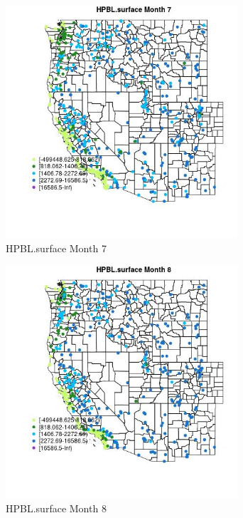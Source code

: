 \begin{figure} 
\centering  
\includegraphics[width=0.77\textwidth]{Code_Outputs/Report_ML_input_PM25_Step4_part_e_de_duplicated_aves_compiled_2019-05-14wNAs_MapObsMo7HPBLsurface.jpg} 
\caption{\label{fig:Report_ML_input_PM25_Step4_part_e_de_duplicated_aves_compiled_2019-05-14wNAsMapObsMo7HPBLsurface}HPBL.surface Month 7} 
\end{figure} 
 

\clearpage 

\begin{figure} 
\centering  
\includegraphics[width=0.77\textwidth]{Code_Outputs/Report_ML_input_PM25_Step4_part_e_de_duplicated_aves_compiled_2019-05-14wNAs_MapObsMo8HPBLsurface.jpg} 
\caption{\label{fig:Report_ML_input_PM25_Step4_part_e_de_duplicated_aves_compiled_2019-05-14wNAsMapObsMo8HPBLsurface}HPBL.surface Month 8} 
\end{figure} 
 

